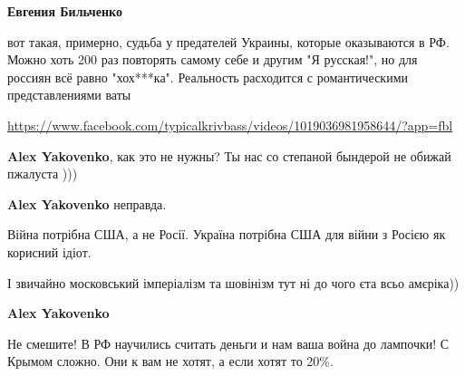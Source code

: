 \begin{itemize}
\begin{itemize}
\textbf{Евгения Бильченко} 

вот такая, примерно, судьба у предателей Украины, которые оказываются в РФ.
Можно хоть 200 раз повторять самому себе и другим "Я русская!", но для россиян
всё равно "хох***ка". Реальность расходится с романтическими представлениями
ваты 

\url{https://www.facebook.com/typicalkrivbass/videos/1019036981958644/?app=fbl}

 
\textbf{Alex Yakovenko}, как это не нужны? Ты нас со степаной бындерой не обижай пжалуста )))

 
\textbf{Alex Yakovenko} неправда.

 
Війна потрібна США, а не Росії.
Україна потрібна США для війни з Росією як корисний ідіот.

 
І звичайно московський імперіалізм та шовінізм тут ні до чого єта всьо амєріка))

 
\textbf{Alex Yakovenko} 

Не смешите! В РФ научились считать деньги и нам ваша война до лампочки! С
Крымом сложно. Они к вам не хотят, а если хотят то 20\%.


\end{itemize}
\end{itemize}

